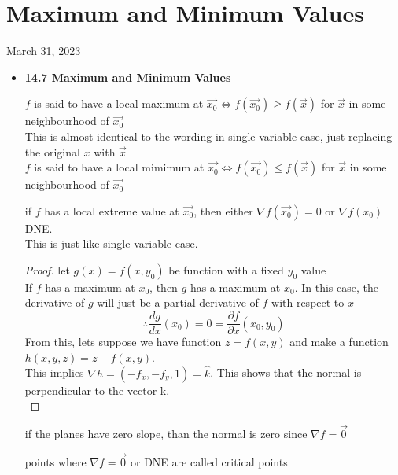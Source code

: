 \section{Maximum and Minimum Values}
March 31, 2023
\begin{itemize}
	\item \textbf{14.7 Maximum and Minimum Values}
		\begin{definition}
			$f$ is said to have a local maximum at $\vec{x_0} \iff f\left( \vec{x_0} \right)  \ge f\left( \vec{x} \right) $ for $\vec{x}$ in some neighbourhood of $\vec{x_0}$ \\
			This is almost identical to the wording in single variable case, just replacing the original $x$ with $\vec{x}$ \\
			$f$ is said to have a local mimimum at $\vec{x_0} \iff f\left( \vec{x_0} \right) \le f\left( \vec{x} \right) $ for $\vec{x}$ in some neighbourhood of $\vec{x_0}$
		\end{definition}
		\begin{theorem}
			if $f$ has a local extreme value at $\vec{x_0}$, then either $\nabla f\left( \vec{x_0} \right)  = 0$ or $\nabla f\left( x_0 \right) $ DNE.\\
			This is just like single variable case.
		\end{theorem}
		\begin{proof}
			let $g\left( x \right) =f\left( x,y_0 \right) $ be function with a fixed $y_0$ value\\
			If $f$ has a maximum at $x_0$, then $g$ has a maximum at $x_0$. In this case, the derivative of $g$ will just be a partial derivative of $f$ with respect to $x$
			\begin{equation}
				\therefore \frac{dg}{dx}\left( x_0 \right)  = 0 = \frac{\partial f}{\partial x} \left( x_0,y_0 \right) 
			\end{equation}
		From this, lets suppose we have function $z = f\left( x,y \right)$ and make a function $h\left( x,y,z \right)  = z - f\left( x,y \right) $.\\ This implies $\nabla h = \left( -f_x, -f_y, 1 \right)  = \hat{k}$. This shows that the normal is perpendicular to the vector k.\\
		\end{proof}
		\begin{idea}
			if the planes have zero slope, than the normal is zero since $\nabla f = \vec{0}$
		\end{idea}
		\begin{definition}
			points where $\nabla f = \vec{0}$ or DNE are called critical points	

\end{definition}
\end{itemize}
